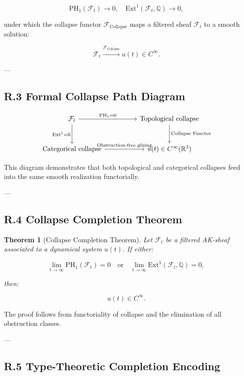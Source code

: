 \documentclass[11pt]{article}
\newtheorem{theorem}{Theorem}[section]
\begin{document}
{\[
\mathrm{PH}_1(\mathcal{F}_t) \to 0, \quad \mathrm{Ext}^1(\mathcal{F}_t, \mathbb{Q}) \to 0,
\]

under which the collapse functor $\mathcal{F}_{\mathrm{Collapse}}$ maps a filtered sheaf $\mathcal{F}_t$ to a smooth solution:

\[
\mathcal{F}_t \xrightarrow{\mathcal{F}_{\mathrm{Collapse}}} u(t) \in C^\infty.
\]

---

\subsection*{R.3 Formal Collapse Path Diagram}

\[
\begin{tikzcd}[column sep=huge, row sep=large]
\mathcal{F}_t \arrow[r, "\mathrm{PH}_1 = 0"] \arrow[d, "\mathrm{Ext}^1 = 0"']
& \text{Topological collapse} \arrow[d, "\text{Collapse Functor}"] \\
\text{Categorical collapse} \arrow[r, "\text{Obstruction-free gluing}"]
& u(t) \in C^\infty(\mathbb{R}^3)
\end{tikzcd}
\]

\noindent
This diagram demonstrates that both topological and categorical collapses feed into the same smooth realization functorially.

---

\subsection*{R.4 Collapse Completion Theorem}

\begin{theorem}[Collapse Completion Theorem]
\label{thm:collapse-completion}
Let $\mathcal{F}_t$ be a filtered AK-sheaf associated to a dynamical system $u(t)$.  
If either:

\[
\lim_{t \to \infty} \mathrm{PH}_1(\mathcal{F}_t) = 0 \quad \text{or} \quad
\lim_{t \to \infty} \mathrm{Ext}^1(\mathcal{F}_t, \mathbb{Q}) = 0,
\]

then:

\[
u(t) \in C^\infty.
\]
\end{theorem}

The proof follows from functoriality of collapse and the elimination of all obstruction classes.

---

\subsection*{R.5 Type-Theoretic Completion Encoding}

}
\end{document}
